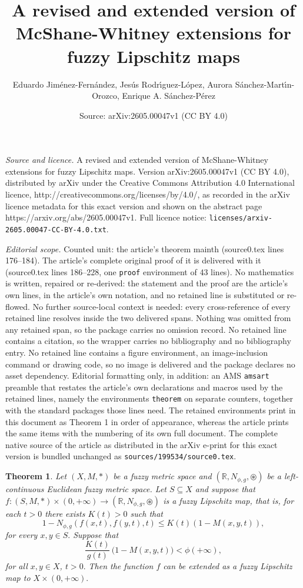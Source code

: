 \documentclass[10pt,a4paper]{amsart}
\title{A revised and extended version of McShane-Whitney extensions for fuzzy Lipschitz maps}
\author{Eduardo Jim\'enez-Fern\'andez, Jes\'us Rodr\'{\i}guez-L\'opez, Aurora S\'anchez-Mart\'{\i}n-Orozco, Enrique A. S\'anchez-P\'erez}
\date{Source: arXiv:2605.00047v1 (CC BY 4.0)}
\newtheorem{theorem}{Theorem}
\begin{document}
\maketitle

\noindent\emph{Source and licence.} A revised and extended version of McShane-Whitney extensions for fuzzy Lipschitz maps. Version arXiv:2605.00047v1 (CC BY 4.0), distributed by arXiv under the Creative Commons Attribution 4.0 International licence, http://creativecommons.org/licenses/by/4.0/, as recorded in the arXiv licence metadata for this exact version and shown on the abstract page https://arxiv.org/abs/2605.00047v1. Full licence notice: \texttt{licenses/arxiv-2605.00047-CC-BY-4.0.txt}.\par\smallskip

\noindent\textit{Editorial scope.} Counted unit: the article's theorem mainth (source0.tex lines 176--184). The article's complete original proof of it is delivered with it (source0.tex lines 186--228, one \texttt{proof} environment of 43 lines). No mathematics is written, repaired or re-derived: the statement and the proof are the article's own lines, in the article's own notation, and no retained line is substituted or re-flowed.  No further source-local context is needed: every cross-reference of every retained line resolves inside the two delivered spans.  Nothing was omitted from any retained span, so the package carries no omission record.  No retained line contains a citation, so the wrapper carries no bibliography and no bibliography entry.  No retained line contains a figure environment, an image-inclusion command or drawing code, so no image is delivered and the package declares no asset dependency.  Editorial formatting only, in addition: an AMS \texttt{amsart} preamble that restates the article's own declarations and macros used by the retained lines, namely the environments \texttt{theorem} on separate counters, together with the standard packages those lines need.  The retained environments print in this document as Theorem 1 in order of appearance, whereas the article prints the same items with the numbering of its own full document.  The complete native source of the article as distributed in the arXiv e-print for this exact version is bundled unchanged as \texttt{sources/199534/source0.tex}.
	\begin{theorem} \label{mainth}
		Let $(X,M,\ast)$ be a fuzzy metric space and $(\mathbb{R},N_{\phi,g},\circledast)$ be a left-continuous Euclidean fuzzy metric space. Let $S\subseteq X$ and suppose that  $f:(S,M,\ast) \times (0,+\infty) \to  (\mathbb R, N_{\phi,g},  \circledast)$
		is a fuzzy Lipschitz map, that is, for each $t>0$ there exists $K(t)>0$ such that 
		$$1 - N_{\phi,g}( f (x,t), f (y,t), t)\leq K(t)(1 - M(x, y, t)),$$
		for every $x,y\in S.$
		Suppose that 
		$$\frac{K(t)}{g(t)} \, \big( 1- M(x,y,t) \big)< \phi(+\infty),$$
		for all $x,y\in X$, $t>0.$ 	Then the function $f$ can be extended as a fuzzy Lipschitz map to $X \times (0,+\infty).$
	\end{theorem}
\end{document}
